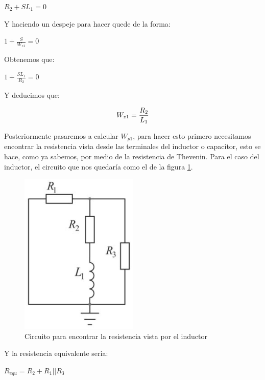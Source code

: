 \documentclass[letterpaper,spanish,12pt]{report}
\begin{document}
	\begin{center} $R_{2} + SL_{1} = 0$ \end{center}

Y haciendo un despeje para hacer quede de la forma:

	\begin{center} $1 + \frac {S} {W_{z1}} = 0 $ \end{center}

Obtenemos que:

	\begin{center} $1 + \frac {SL_{1}} {R_{2}} = 0 $ \end{center}

Y deducimos que:

	\begin{equation}
		\centering
		W_{z1} = \frac {R_{2}} {L_{1}} 
		\label{ecu:3}
	\end{equation}

Posteriormente pasaremos a calcular $W_{p1}$, para hacer esto primero necesitamos encontrar la resistencia vista desde las terminales del inductor o capacitor, esto se hace, como ya sabemos, por medio de la resistencia de Thevenin. Para el caso del inductor, el circuito que nos quedar\'ia como el de la figura \ref{cir:4}.

\begin{figure}[h]
	\centering
		\includegraphics[width=0.50\textwidth]{Circuito5.eps}
	\caption{Circuito para encontrar la resistencia vista por el inductor}
	\label{cir:4}
\end{figure}

Y la resistencia equivalente seria:

	\begin{center} $R_{equ} = R_{2} + R_{1}||R_{3}$ \end{center}
\end{document}
